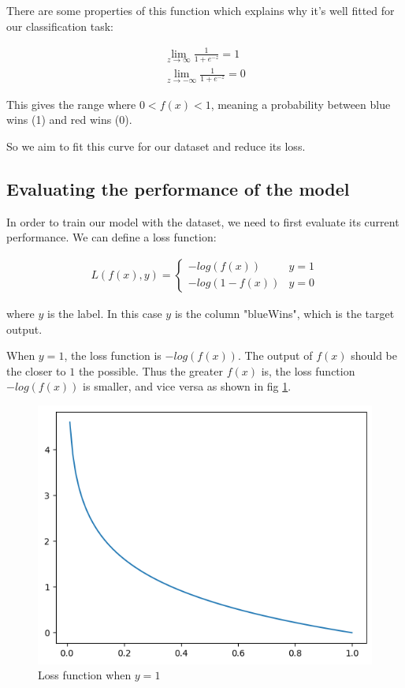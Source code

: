 \documentclass[stu,12pt,floatsintext]{apa7}
\begin{document}
There are some properties of this function which explains why it's well fitted for our classification task:

\begin{gather}
    \lim_{z \to \infty} \frac{1}{1 + e^{-z}} = 1\\
    \lim_{z \to -\infty} \frac{1}{1 + e^{-z}} = 0
\end{gather}

This gives the range where $0<f(x)<1$, meaning a probability between blue wins (1) and red wins (0).

So we aim to fit this curve for our dataset and reduce its loss.

\subsection{Evaluating the performance of the model}
In order to train our model with the dataset, we need to first evaluate its current performance. We can define a loss function:

\begin{gather}
    L(f(x),y)=\begin{cases}
        -log(f(x)) & y=1\\
        -log(1-f(x)) & y=0
    \end{cases}
    \label{eq:loss-function1}
\end{gather}

where $y$ is the label. In this case $y$ is the column "blueWins", which is the target output. 

When $y=1$, the loss function is $-log(f(x))$. The output of $f(x)$ should be the closer to $1$ the possible. Thus the greater $f(x)$ is, the loss function $-log(f(x))$ is smaller, and vice versa as shown in fig \ref{fig:loss-function1}.

\begin{figure}[h]
    \centering
    \includegraphics[width=0.5\linewidth]{images/loss-function1.png}
    \caption{Loss function when $y=1$}
    \label{fig:loss-function1}
\end{figure}
\end{document}

